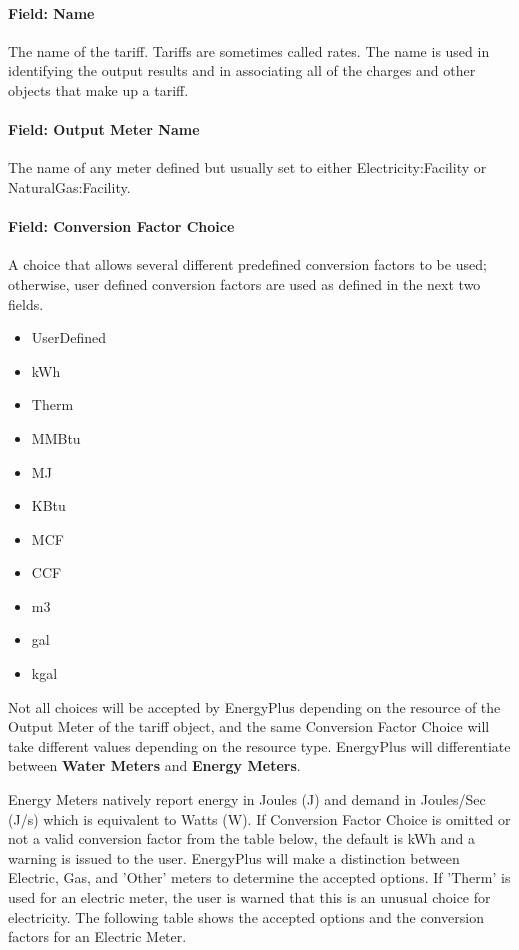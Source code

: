 \paragraph{Field: Name}\label{field-name-064}

The name of the tariff. Tariffs are sometimes called rates. The name is used in identifying the output results and in associating all of the charges and other objects that make up a tariff.

\paragraph{Field: Output Meter Name}\label{field-output-meter-name}

The name of any meter defined but usually set to either Electricity:Facility or NaturalGas:Facility.

\paragraph{Field: Conversion Factor Choice}\label{field-conversion-factor-choice}

A choice that allows several different predefined conversion factors to be used; otherwise, user defined conversion factors are used as defined in the next two fields.

\begin{itemize}
\item
  UserDefined
\item
  kWh
\item
  Therm
\item
  MMBtu
\item
  MJ
\item
  KBtu
\item
  MCF
\item
  CCF
\item
  m3
\item
  gal
\item
  kgal
\end{itemize}

Not all choices will be accepted by EnergyPlus depending on the resource of the Output Meter of the tariff object, and the same Conversion Factor Choice will take different values depending on the resource type. EnergyPlus will differentiate between \textbf{Water Meters} and \textbf{Energy Meters}.

Energy Meters natively report energy in Joules (J) and demand in Joules/Sec (J/s) which is equivalent to Watts (W).
If Conversion Factor Choice is omitted or not a valid conversion factor from the table below, the default is kWh and a warning is issued to the user.
EnergyPlus will make a distinction between Electric, Gas, and 'Other' meters to determine the accepted options. If 'Therm' is used for an electric meter, the user is warned that this is an unusual choice for electricity. The following table shows the accepted options and the conversion factors for an Electric Meter.


